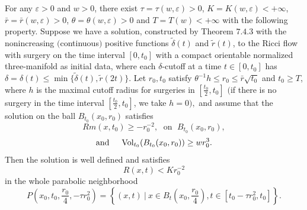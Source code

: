 \begin{theorem}
  \label{thm:cz-large-time-surgery-curvature-estimate}

For any $\varepsilon > 0$ and $w>0$, there exist
$\tau=\tau(w,\varepsilon)>0$, $K=K(w,\varepsilon)<+\infty$,
$\bar{r}=\bar{r}(w,\varepsilon)>0$,
$\theta=\theta(w,\varepsilon)>0$ and $T=T(w) < +\infty$ with the
following property. Suppose we have a solution, constructed by
Theorem $7.4.3$ with the nonincreasing $($continuous$)$ positive
functions $\widetilde{\delta}(t)$ and $\widetilde{r}(t)$, to the
Ricci flow with surgery on the time interval $[0,t_0]$ with a
compact orientable normalized three-manifold as initial data,
where each $\delta$-cutoff at a time $t \in [0,t_0]$ has
$\delta=\delta(t) \leq \min
\{\widetilde{\delta}(t),\widetilde{r}(2t)\}$. Let $r_0,t_0$
satisfy $\theta^{-1}h\leq r_0\leq \bar{r}\sqrt{t_0}$ and $t_0 \geq
T$, where $h$ is the maximal cutoff radius for surgeries in
$[\frac{t_0}{2},t_0]$ $($if there is no surgery in the time
interval $[\frac{t_0}{2},t_0]$, we take $h=0),$ and assume that
the solution on the ball $B_{t_0}(x_0,r_0)$ satisfies
$$
Rm(x,t_0) \geq -r^{-2}_0,\; \mbox{ on }\; B_{t_0}(x_0,r_0),
$$
$$
\mbox{and }\quad  \operatorname{Vol}_{t_0}(B_{t_0}(x_0,r_0)) \geq w r^3_0.
$$
Then the solution is well defined and satisfies
$$
R(x,t)<Kr^{-2}_0
$$
in the whole parabolic neighborhood
$$
P\left(x_0,t_0,\frac{r_0}{4},-\tau r^2_0\right) =\left\{(x,t)\ |\ x\in
B_t\left(x_0,\frac{r_0}{4}\right),t\in[t_0-\tau r^2_0,t_0]\right\}.
$$
\end{theorem}

